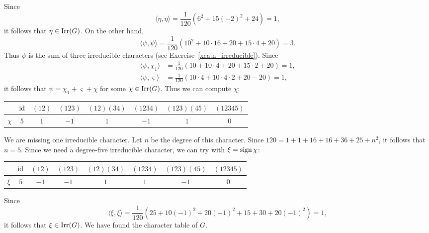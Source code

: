 Since 
\[
\langle\eta,\eta\rangle
=\frac{1}{120}(6^2+15(-2)^2+24)=1,
\]
it follows that $\eta\in\operatorname{Irr}(G)$. On the other hand,
\[
\langle\psi,\psi\rangle
=\frac{1}{120}(10^2+10\cdot16+20+15\cdot 4+20)=3. 
\]
Thus $\psi$ is the sum of three irreducible characters (see Exercise~\ref{xca:n_irreducible}). Since 
\begin{align*}
\langle\psi,\chi_1\rangle&=\frac{1}{120}(10+10\cdot 4+20+15\cdot 2+20)=1,\\
\langle\psi,\varsigma\rangle&=\frac{1}{120}(10\cdot 4+10\cdot 4\cdot 2+20-20)=1,
\end{align*}
it follows that 
$\psi=\chi_1+\varsigma+\chi$ for some $\chi\in\operatorname{Irr}(G)$. Thus
we can compute $\chi$:
\bigskip 
\begin{center}
    \begin{tabular}{|c|ccccccc|}
        \hline 
        & $\operatorname{id}$ & $(12)$ & $(123)$ & $(12)(34)$ & $(1234)$ & $(123)(45)$  & $(12345)$ \\
        \hline 
        $\chi$ & $5$ & $1$ & $-1$ & $1$ & $-1$ & $1$ & $0$ \\
        \hline 
    \end{tabular}
\end{center}
\bigskip 
We are missing one irreducible character. Let $n$ be 
the degree of this character. Since 
$120=1+1+16+16+36+25+n^2$, it follows that 
$n=5$. Since we need a degree-five
irreducible character, we can try with
$\xi=\operatorname{sign}\chi$:
\bigskip 
\begin{center}
    \begin{tabular}{|c|ccccccc|}
        \hline 
        & $\operatorname{id}$ & $(12)$ & $(123)$ & $(12)(34)$ & $(1234)$ & $(123)(45)$  & $(12345)$ \\
        \hline 
        $\xi$ & $5$ & $-1$ & $-1$ & $1$ & $1$ & $-1$ & $0$ \\
        \hline 
    \end{tabular}
\end{center}
\bigskip 

Since 
\[
\langle\xi,\xi\rangle=\frac{1}{120}(25+10(-1)^2+20(-1)^2+15+30+20(-1)^2)
=1,
\]
it follows that $\xi\in\operatorname{Irr}(G)$. We have found the character table of $G$. 

